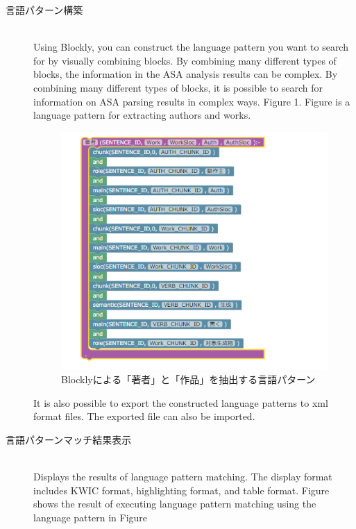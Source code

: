 \begin{description}
\item[言語パターン構築]\mbox{}\\
Using Blockly, you can construct the language pattern you want to search for by visually combining blocks.
By combining many different types of blocks, the information in the ASA analysis results can be complex. By combining many different types of blocks, it is possible to search for information on ASA parsing results in complex ways.
Figure 1. Figure is a language pattern for extracting authors and works.

\begin{figure}[htbp]
  \centering
  \includegraphics[scale=.3]{figure/make_pattern.png}
  \caption{Blocklyによる「著者」と「作品」を抽出する言語パターン}
\end{figure}

It is also possible to export the constructed language patterns to xml format files.
The exported file can also be imported.
\item[言語パターンマッチ結果表示]\mbox{}\\
Displays the results of language pattern matching. The display format includes KWIC format, highlighting format, and
table format. Figure  shows the result of executing language pattern matching using the language pattern in Figure 


\end{description}
